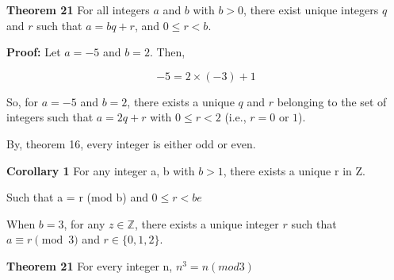 \documentclass[12 pt]{article}        	%
\newcommand{\eqn}[0]{\begin{array}{rcl}}%
\newcommand{\eqnend}[0]{\end{array} }  	%
\newcommand{\qed}[0]{$\square$}        	%
\begin{document}

                                   



\textbf{Theorem 21}							%
For all integers $a$ and $b$ with $b > 0$, there exist unique integers $q$ and $r$ such that $a = bq + r$, and $0 \leq r < b$.

\textbf{Proof:}   
Let $a = -5$ and $b = 2$. Then,

\[
-5 = 2 \times (-3) + 1
\]

So, for $a = -5$ and $b = 2$, there exists a unique $q$ and $r$ belonging to the set of integers such that $a = 2q + r$ with $0 \leq r < 2$ (i.e., $r = 0$ or $1$).

By, theorem 16, every integer is either odd or even.

\textbf{Corollary 1} 
For any integer a, b with $b > 1$, there exists a unique r in Z.

Such that a = r (mod b) and $0 \leq r < be$

When $b = 3$, for any $z \in \mathbb{Z}$, there exists a unique integer $r$ such that $a \equiv r \pmod{3}$ and $r \in \{0, 1, 2\}$.

\textbf{Theorem 21}	
For every integer n, $n^3 = n (mod 3)$
\end{document}
